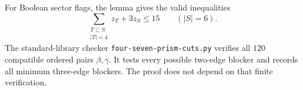 For Boolean sector flags, the lemma gives the valid inequalities
\[
 \sum_{\substack{T\subset S\\|T|=4}}z_T+3z_S\le15
 \qquad(|S|=6).
\]
The standard-library checker \texttt{four-seven-prism-cuts.py} verifies all $120$ compatible ordered pairs $\beta,\gamma$.
It tests every possible two-edge blocker and records all minimum three-edge blockers.
The proof does not depend on that finite verification.
